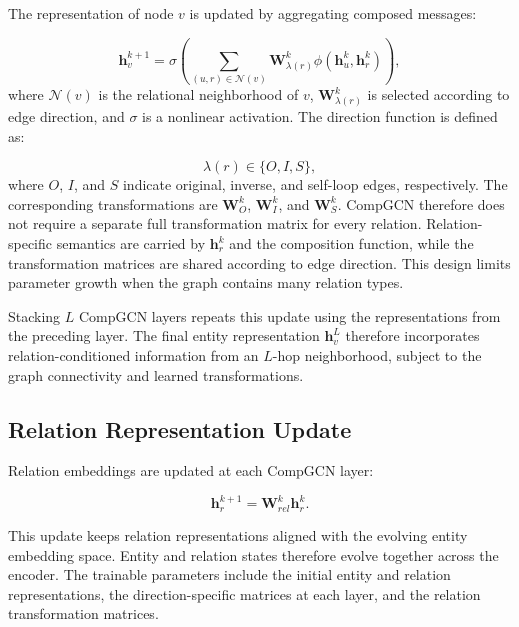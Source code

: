 The representation of node $v$ is updated by aggregating composed messages:

\begin{equation}
    \mathbf{h}_{v}^{k+1}
    =
    \sigma
    \left(
        \sum_{(u,r)\in\mathcal{N}(v)}
        \mathbf{W}_{\lambda(r)}^{k}
        \phi
        \left(
            \mathbf{h}_{u}^{k},
            \mathbf{h}_{r}^{k}
        \right)
    \right),
    \label{eq:compgcn_node_update}
\end{equation}
where $\mathcal{N}(v)$ is the relational neighborhood of $v$,
$\mathbf{W}_{\lambda(r)}^{k}$ is selected according to edge direction, and
$\sigma$ is a nonlinear activation. The direction function is defined as:

\begin{equation}
    \lambda(r)
    \in
    \{O,I,S\},
\end{equation}
where $O$, $I$, and $S$ indicate original, inverse, and self-loop edges,
respectively. The corresponding transformations are
$\mathbf{W}_{O}^{k}$, $\mathbf{W}_{I}^{k}$, and $\mathbf{W}_{S}^{k}$.
CompGCN therefore does not require a separate full transformation matrix for
every relation. Relation-specific semantics are carried by
$\mathbf{h}_{r}^{k}$ and the composition function, while the transformation
matrices are shared according to edge direction. This design limits parameter
growth when the graph contains many relation types.

Stacking $L$ CompGCN layers repeats this update using the representations from
the preceding layer. The final entity representation
$\mathbf{h}_{v}^{L}$ therefore incorporates relation-conditioned information
from an $L$-hop neighborhood, subject to the graph connectivity and learned
transformations.

\subsection{Relation Representation Update}

Relation embeddings are updated at each CompGCN layer:

\begin{equation}
    \mathbf{h}_{r}^{k+1}
    =
    \mathbf{W}_{rel}^{k}
    \mathbf{h}_{r}^{k}.
    \label{eq:compgcn_relation_update}
\end{equation}

This update keeps relation representations aligned with the evolving entity
embedding space. Entity and relation states therefore evolve together across
the encoder. The trainable parameters include the initial entity and relation
representations, the direction-specific matrices at each layer, and the
relation transformation matrices.

